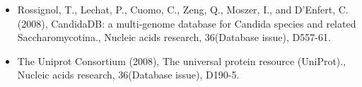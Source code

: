 \begin{itemize}[leftmargin=*]
\item[]{
Rossignol, T., Lechat, P., Cuomo, C., Zeng, Q., Moszer, I., and D'Enfert, C. (2008), 
CandidaDB: a multi-genome database for Candida species and related Saccharomycotina.,
Nucleic acids research, 36(Database issue), D557-61.
}

\item[]{
The Uniprot Consortium (2008), The universal protein resource (UniProt).,
Nucleic acids research, 36(Database issue), D190-5.
}

\end{itemize}




